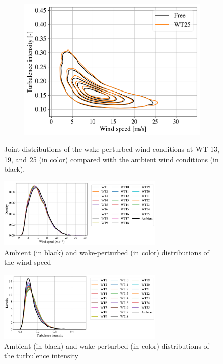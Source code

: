 \begin{figure}[h]
\begin{subfigure}[b]{0.3\textwidth}
        \includegraphics[width=\textwidth]{part2/figures/WAKE/joint_perturbation_SB_WT25.png}
    \end{subfigure}
    \caption{Joint distributions of the wake-perturbed wind conditions at WT 13, 19, and 25 (in color) compared with the ambient wind conditions (in black).}
    \label{fig:FIGJointPerturbationSB}
\end{figure}

\begin{figure}[h]
    \centering
    \includegraphics[width=0.7\textwidth]{part2/figures/WAKE/perturbed_wsp_distribution_SB.png}
    \caption{Ambient (in black) and wake-perturbed (in color) distributions of the wind speed}
    \label{fig:FIGMarginalWSP}
\end{figure}

\begin{figure}[h]
    \centering
    \includegraphics[width=0.7\textwidth]{part2/figures/WAKE/perturbed_ti_distribution_SB.png}
    \caption{Ambient (in black) and wake-perturbed (in color) distributions of the turbulence intensity}
    \label{fig:FIGMarginalTI}
\end{figure}




